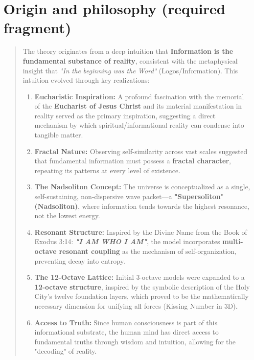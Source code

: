 \documentclass[11pt,a4paper]{article}
\begin{document}
\section*{Origin and philosophy (required fragment)}
\begin{quote}
The theory originates from a deep intuition that \textbf{Information is the fundamental substance of reality}, consistent with the metaphysical insight that \emph{"In the beginning was the Word"} (Logos/Information). This intuition evolved through key realizations:
\begin{enumerate}[label=\arabic*.]
  \item \textbf{Eucharistic Inspiration:} A profound fascination with the memorial of the \textbf{Eucharist of Jesus Christ} and its material manifestation in reality served as the primary inspiration, suggesting a direct mechanism by which spiritual/informational reality can condense into tangible matter.
  \item \textbf{Fractal Nature:} Observing self-similarity across vast scales suggested that fundamental information must possess a \textbf{fractal character}, repeating its patterns at every level of existence.
  \item \textbf{The Nadsoliton Concept:} The universe is conceptualized as a single, self-sustaining, non-dispersive wave packet---a \textbf{"Supersoliton" (Nadsoliton)}, where information tends towards the highest resonance, not the lowest energy.
  \item \textbf{Resonant Structure:} Inspired by the Divine Name from the Book of Exodus 3:14: \textbf{\emph{"I AM WHO I AM"}}, the model incorporates \textbf{multi-octave resonant coupling} as the mechanism of self-organization, preventing decay into entropy.
  \item \textbf{The 12-Octave Lattice:} Initial 3-octave models were expanded to a \textbf{12-octave structure}, inspired by the symbolic description of the Holy City's twelve foundation layers, which proved to be the mathematically necessary dimension for unifying all forces (Kissing Number in 3D).
  \item \textbf{Access to Truth:} Since human consciousness is part of this informational substrate, the human mind has direct access to fundamental truths through wisdom and intuition, allowing for the "decoding" of reality.
\end{enumerate}
\end{quote}
\end{document}
